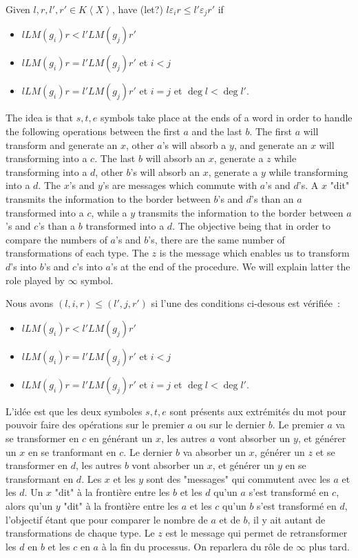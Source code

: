 \documentclass[sigconf]{acmart}
\theoremstyle{plain}
\theoremstyle{definition}
\theoremstyle{remark}
\newcommand{\LM}{LM}
\newcommand\fixmecc[1]{{\color{red}{\underline{\bf C:}} #1}}
\newcommand{\KX}{K \left\langle X \right\rangle}
\begin{document}
\fixmecc{Given $l,r,l',r'\in\KX$, have (let?) $l\varepsilon_i r\leq l'\varepsilon_j r'$ if
  \begin{itemize}
  \item $l\LM(g_i)r < l'\LM(g_j)r'$
  \item $l\LM(g_i)r = l'\LM(g_j)r'$ et $i < j$
  \item $l\LM(g_i)r = l'\LM(g_j)r'$ et $i = j$ et $\deg{l} < \deg{l'}$.
  \end{itemize}
  The idea is that $s, t, e$ symbols take place at the ends of a word in order to handle the following operations between the first $a$ and the last $b$.
  The first $a$ will transform and generate an $x$, other $a$'s will absorb a $y$, and generate an $x$ will transforming into a $c$.
The last $b$ will absorb an $x$, generate a $z$ while transforming into a $d$, other $b$'s will absorb an $x$, generate a $y$ while transforming into a $d$.
The $x$'s and $y$'s are messages which commute with $a$'s and $d$'s. A $x$ "dit" transmits the information to the border between $b$'s and $d$'s than an $a$ transformed into a $c$, while a $y$ transmits the information to the border between $a$'s and $c$'s than a $b$ transformed into a $d$. The objective being that in order to compare the numbers of $a$'s and $b$'s, there are the same number of transformations of each type.
The $z$ is the message which enables us to transform $d$'s into $b$'s and $c$'s into $a$'s at the end of the procedure.
We will explain latter the role played by $\infty$ symbol.
}

{  Nous avons $(l, i, r) \leq (l', j, r')$ si l'une des conditions ci-desous est vérifiée~:
\begin{itemize}
	\item $l\LM(g_i)r < l'\LM(g_j)r'$
	\item $l\LM(g_i)r = l'\LM(g_j)r'$ et $i < j$
	\item $l\LM(g_i)r = l'\LM(g_j)r'$ et $i = j$ et $\deg{l} < \deg{l'}$.
\end{itemize}

L'idée est que les deux symboles $s, t, e$ sont présents aux extrémités du mot pour pouvoir faire des opérations sur le premier $a$ ou sur le dernier $b$.
Le premier $a$ va se transformer en $c$ en générant un $x$, les autres $a$ vont absorber un $y$, et générer un $x$ en se tranformant en $c$.
Le dernier $b$ va absorber un $x$, générer un $z$ et se transformer en $d$, les autres $b$ vont absorber un $x$, et générer un $y$ en se transformant en $d$.
Les $x$ et les $y$ sont des "messages" qui commutent avec les $a$ et les $d$. Un $x$ "dit" à la frontière entre les $b$ et les $d$ qu'un $a$ s'est transformé en $c$, alors qu'un $y$ "dit" à la frontière entre les $a$ et les $c$ qu'un $b$ s'est transformé en $d$, l'objectif étant que pour comparer le nombre de $a$ et de $b$, il y ait autant de transformations de chaque type.
Le $z$ est le message qui permet de retransformer les $d$ en $b$ et les $c$ en $a$ à la fin du processus. On reparlera du rôle de $\infty$ plus tard.
}
\end{document}
